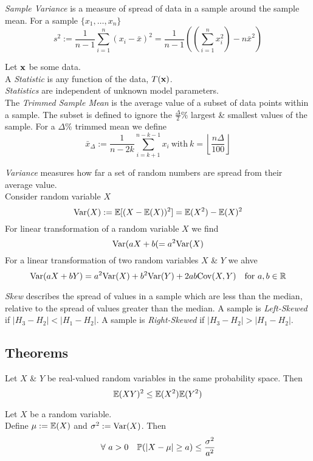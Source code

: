 \documentclass[11pt,a4paper]{article}
\begin{document}
\textit{Sample Variance} is a measure of spread of data in a sample around the sample mean. For a sample $\{x_1,\dots,x_n\}$
$$s^2:=\frac{1}{n-1}\sum_{i=1}^n(x_i-\bar{x})^2=\frac{1}{n-1}\left(\left(\sum_{i=1}^nx_i^2\right)-n\bar{x}^2\right)$$

Let $\textbf{x}$ be some data.\\
A \textit{Statistic} is any function of the data, $T(\textbf{x})$.\\
\nb \textit{Statistics} are independent of unknown model parameters.\\

The \textit{Trimmed Sample Mean} is the average value of a subset of data points within a sample. The subset is defined to ignore the $\frac{\Delta}{2}\%$ largest \& smallest values of the sample. For a $\Delta\%$ trimmed mean we define
$$\bar{x}_\Delta:=\frac{1}{n-2k}\sum_{i=k+1}^{n-k-1}x_i\ \mathrm{with}\ k=\left\lfloor\frac{n\Delta}{100}\right\rfloor$$

\textit{Variance} measures how far a set of random numbers are spread from their average value.\\
Consider random variable $X$
$$\mathrm{Var}(X):=\mathbb{E}[(X-\mathbb{E}(X))^2]=\mathbb{E}(X^2)-\mathbb{E}(X)^2$$
For linear transformation of a random variable $X$ we find
$$\mathrm{Var}(aX+b(=a^2\mathrm{Var}(X)$$
For a linear transformation of two random variables $X$ \& $Y$ we ahve
$$\mathrm{Var}(aX+bY)=a^2\mathrm{Var}(X)+b^2\mathrm{Var}(Y)+2ab\mathrm{Cov}(X,Y)\quad\text{for }a,b\in\mathbb{R}$$

\textit{Skew} describes the spread of values in a sample which are less than the median, relative to the spread of values greater than the median. A sample is \textit{Left-Skewed} if $|H_3-H_2|<|H_1-H_2|$. A sample is \textit{Right-Skewed} if $|H_3-H_2|>|H_1-H_2|$.\\

\subsection{Theorems}

Let $X$ \& $Y$ be real-valued random variables in the same probability space. Then
$$\mathbb{E}(XY)^2\leq\mathbb{E}(X^2)\mathbb{E}(Y^2)$$

Let $X$ be a random variable.\\
Define $\mu:=\mathbb{E}(X)$ and $\sigma^2:=\mathrm{Var}(X)$. Then
$$\forall\ a>0\quad\mathbb{P}(|X-\mu|\geq a)\leq\frac{\sigma^2}{a^2}$$
\end{document}
